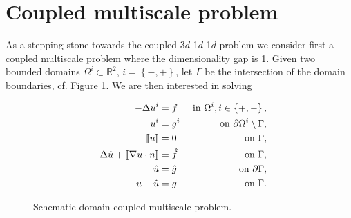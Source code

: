 \documentclass[r]{siamart171218}
\begin{document}
\section{Coupled multiscale problem}\label{sec:coupled} As a stepping stone
towards the coupled 3$d$-1$d$-1$d$ problem we consider first a coupled multiscale
problem where the dimensionality gap is 1. Given two bounded domains $\Omega^i \subset\mathbb{R}^2$,
$i=\left\{-, +\right\}$, let $\Gamma$ be the intersection of the domain boundaries,
cf. Figure \ref{fig:coupled_domain}. We are then interested in solving

\begin{minipage}{0.47\textwidth}
  \begin{equation}
    \begin{aligned}
      -\Delta u^i &= f &\mbox{ in }\Omega^{i}, i\in\left\{+, -\right\},\\
      u^i &= g^i &\mbox{ on }\partial\Omega^{i}\setminus\Gamma,\\
      \jump{u} &= 0 &\mbox{ on }\Gamma,\\
      -\Delta \hat{u} + \jump{\nabla u\cdot n}&= \hat{f} &\mbox{ on }\Gamma,\\
      \hat{u} &= \hat{g} &\mbox{ on }\partial\Gamma,\\
      u - \hat{u} &= g&\mbox{ on }\Gamma.\\
    \end{aligned}
\end{equation}
\null
\par\xdef\tpd{\the\prevdepth}
\end{minipage}
\hfill
\begin{minipage}{0.47\textwidth}
  \begin{figure}[H]
    \begin{center}
    \end{center}
    \caption{Schematic domain coupled multiscale problem.}
    \label{fig:coupled_domain}
\end{figure}
\end{minipage}
%




\end{document}
